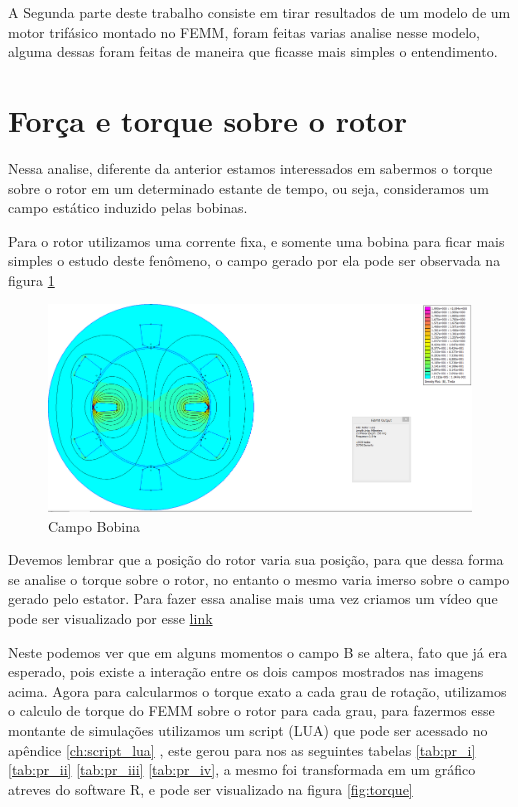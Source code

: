 \documentclass[
	12pt,				%
	openright,			%
	twoside,			%
	a4paper,			%
	english,			%
	french,				%
	spanish,			%
	brazil,				%
	]{abntex2}
\begin{document}
A Segunda parte deste trabalho consiste em tirar resultados de um modelo de um motor  trifásico montado no FEMM, foram feitas varias analise nesse modelo, alguma dessas foram feitas de maneira que ficasse mais simples o entendimento.


\section{Força e torque sobre o rotor}

Nessa analise, diferente da anterior estamos interessados em sabermos o torque sobre o rotor em um determinado estante de tempo, ou seja, consideramos um campo estático induzido pelas bobinas.

Para o rotor utilizamos uma corrente fixa, e somente uma bobina para ficar mais simples o estudo deste fenômeno, o campo gerado por ela pode ser observada na figura \ref{fig:m_c_b}

\begin{figure}[H]
    \centering
    \includegraphics[width=15cm]{img/motor_campo_bobina.png}
    \caption{Campo Bobina}
    \label{fig:m_c_b}
\end{figure}



Devemos lembrar que a posição do rotor varia sua posição, para que dessa forma se analise o torque sobre o rotor, no entanto o mesmo varia imerso sobre o campo gerado pelo estator. Para fazer essa analise mais uma vez criamos um vídeo que pode ser visualizado por esse \href{https://www.youtube.com/watch?v=PQLGsbMnyD4}{link}

Neste podemos ver que em alguns momentos o campo B se altera, fato que já era esperado, pois existe a interação entre os dois campos mostrados nas imagens acima. Agora para calcularmos o torque exato a cada grau de rotação, utilizamos o calculo de torque do FEMM sobre o rotor para cada grau, para fazermos esse montante de simulações utilizamos um script (LUA) que pode ser acessado no apêndice \ref{ch:script_lua} , este gerou para nos as seguintes tabelas \ref{tab:pr_i}  \ref{tab:pr_ii}  \ref{tab:pr_iii}  \ref{tab:pr_iv}, a mesmo foi transformada em um gráfico atreves do software R, e pode ser visualizado na figura \ref{fig:torque}
\end{document}
